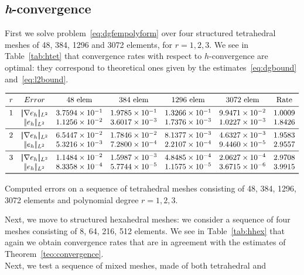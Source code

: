 \documentclass[12pt, a4paper]{article}
\theoremstyle{definition}
\theoremstyle{plain}
\theoremstyle{plain}
\theoremstyle{definition}
\begin{document}
\subsection{\textit{h}-convergence}
First we solve problem~\eqref{eq:dgfempolyform} over four structured 
tetrahedral meshes of 48, 
384, 1296 and 3072 elements, for $r=1,2,3$. We see in Table~\ref{tab:htet} that 
convergence rates with respect to $h$-convergence are optimal: they correspond 
to theoretical ones given by the estimates~\eqref{eq:dgbound} 
and~\eqref{eq:l2bound}.\\
\begin{table}[h]\footnotesize
	\centering
	\[
	\begin{array}{ccccccc}
	\toprule
	r & Error & \text{48 elem} & \text{384 elem} & \text{1296 elem} & \text{3072 elem} & \text{Rate} \\ 
	\midrule
	1 & |\!|\nabla e_{h}|\!|_{L^2}   & 3.7594 \times 10^{-1} & 1.9785 \times 10^{-1} & 1.3266 \times 10^{-1} & 9.9471 \times 10^{-2} & 1.0009\\
	& |\!|e_{h}|\!|_{L^2} & 1.1256 \times 10^{-2} & 3.6017 \times 10^{-3} & 1.7376 \times 10^{-3} & 1.0227 \times 10^{-3} & 1.8426\\
	\midrule
	2 & |\!|\nabla e_{h}|\!|_{L^2}   & 6.5447 \times 10^{-2} & 1.7846 \times 10^{-2} & 8.1377 \times 10^{-3} & 4.6327 \times 10^{-3} & 1.9583\\
	& |\!|e_{h}|\!|_{L^2} & 5.3216 \times 10^{-3} & 7.2800 \times 10^{-4} & 2.2107 \times 10^{-4} & 9.4460 \times 10^{-5} & 2.9557\\
	\midrule
	3 & |\!|\nabla e_{h}|\!|_{L^2}   & 1.1484 \times 10^{-2} & 1.5987 \times 10^{-3} & 4.8485 \times 10^{-4} & 2.0627 \times 10^{-4} & 2.9708\\
	& |\!|e_{h}|\!|_{L^2} & 8.3358 \times 10^{-4} & 5.7744 \times 10^{-5} & 1.1575 \times 10^{-5} & 3.6715 \times 10^{-6} & 3.9915\\
	\bottomrule
	\end{array}
	\]
	\caption{Computed errors on a sequence of tetrahedral meshes consisting of 
	48, 384, 1296, 3072 elements and polynomial degree $r=1,2,3$.} \label{tab:htet}
\end{table}
Next, we move to structured hexahedral meshes: we consider a sequence of four 
meshes consisting of 8, 64, 216, 512 elements. We see in 
Table~\ref{tab:hhex} that again we obtain convergence rates that are in 
agreement with the estimates of Theorem~\ref{teo:convergence}.\\
Next, we test a sequence of mixed meshes, made of both tetrahedral and 
\end{document}
